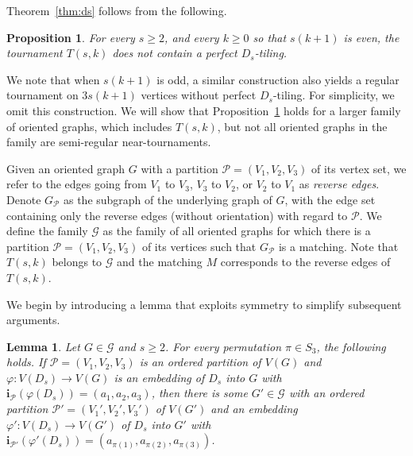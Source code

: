 \documentclass[11pt]{amsart}
\newtheorem{lemma}[theorem]{Lemma}
\newtheorem{prop}[theorem]{Proposition}
\newcommand{\CP}{\mathcal{P}}
\newcommand{\G}{\mathcal{G}}
\begin{document}
\medskip
Theorem~\ref{thm:ds} follows from the following.

\begin{prop}\label{prop:dr}
    For every $s\ge 2$, and every $k \ge 0$ so that $s(k+1)$ is even, the tournament $T(s,k)$ does not contain a perfect $D_s$-tiling.
\end{prop} 

We note that when $s(k+1)$ is odd, a similar construction also yields a regular tournament on $3s(k+1)$ vertices without perfect $D_s$-tiling. For simplicity, we omit this construction. We will show that Proposition~\ref{prop:dr} holds for a larger family of oriented graphs, which includes $T(s,k)$, but not all oriented graphs in the family are semi-regular near-tournaments. 

Given an oriented graph $G$ with a partition $\CP=(V_1,V_2,V_3)$ of its vertex set, we refer to the edges going from $V_1$ to $V_3$, $V_3$ to $V_2$, or $V_2$ to $V_1$ as \emph{reverse edges}.
Denote $G_\CP$ as the subgraph of the underlying graph of $G$, with the edge set containing only the reverse edges (without orientation) with regard to $\CP$.
We define the family $\G$ as the family of all oriented graphs for which there is a partition $\CP=(V_1,V_2,V_3)$ of its vertices such that $G_\CP$ is a matching.
Note that $T(s,k)$ belongs to $\G$ and the matching $M$ corresponds to the reverse edges of $T(s,k)$.

We begin by introducing a lemma that exploits symmetry to simplify subsequent arguments.

\begin{lemma}\label{lem:sym}
    Let $G\in \G$ and $s\ge 2$. For every permutation $\pi \in S_3$, the following holds. If $\CP=(V_1,V_2,V_3)$ is an ordered partition of $V(G)$ and $\varphi: V(D_s) \to V(G)$ is an embedding of $D_s$ into $G$ with $\mathbf{i}_\CP(\varphi(D_s))=(a_1,a_2,a_3)$, then there is some $G'\in\G$ with an ordered partition $\CP' = (V_1',V_2',V_3')$ of $V(G')$ and an embedding $\varphi': V(D_s) \to V(G')$ of $D_s$ into $G'$ with $\mathbf{i}_{\CP'}(\varphi'(D_s))=(a_{\pi(1)},a_{\pi(2)},a_{\pi(3)})$.
\end{lemma}
\end{document}
